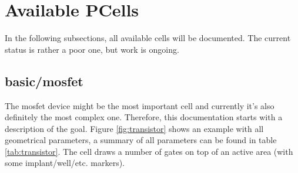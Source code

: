\section{Available PCells}
In the following subsections, all available cells will be documented.
The current status is rather a poor one, but work is ongoing.

\subsection{basic/mosfet}
The mosfet device might be the most important cell and currently it's also definitely the most complex one.
Therefore, this documentation starts with a description of the goal.
Figure \ref{fig:transistor} shows an example with all geometrical parameters, a summary of all parameters can be found in table \ref{tab:transistor}.
The cell draws a number of gates on top of an active area (with some implant/well/etc.
markers).
